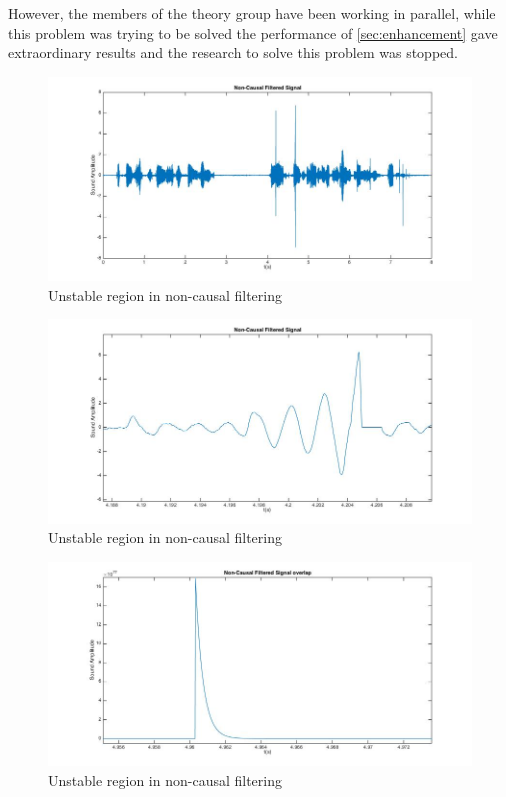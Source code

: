 \documentclass[11pt,a4paper,english]{book}  %
\theoremstyle{definition}  %
\theoremstyle{plain}  %
\theoremstyle{remark}  %
\begin{document}
		However, the members of the theory group have been working in parallel, while this problem was trying to be solved the performance of \ref{sec:enhancement} gave extraordinary results and the research to solve this problem was stopped.
		
	
		
		\begin{figure}[h]
		\centering
		\includegraphics[width=15cm]{images/theory/nonc.jpg}
		\caption{Unstable region in non-causal filtering}
		\label{fig:nonc}
		\end{figure}		
		
		\begin{figure}[h]
		\centering
		\includegraphics[width=15cm]{images/theory/noncunstable.jpg}
		\caption{Unstable region in non-causal filtering}
		\label{fig:noncunstable}
		\end{figure}
		
		\begin{figure}[h]
		\centering
		\includegraphics[width=15cm]{images/theory/noncunstableoverlap.jpg}
		\caption{Unstable region in non-causal filtering}
		\label{fig:noncunstableoverlap}
		\end{figure}		
	
\end{document}
